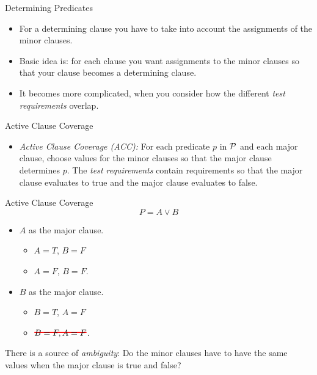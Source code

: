 \documentclass{beamer}
\newcommand{\predset}{{\cal P}}
\newcommand\hcancel[2][red]{\setbox0=\hbox{$#2$}%
\rlap{\raisebox{.45\ht0}{\textcolor{#1}{\rule{\wd0}{1pt}}}}#2}
\begin{document}
\begin{frame}{Determining Predicates}
    
  \begin{itemize}
  \item For a determining clause you have to take into account the
    assignments of the minor clauses.

  \item Basic idea is: for each clause you want assignments to the minor
clauses so that your clause becomes a determining clause.
\item It becomes more complicated, when you consider how the different
  {\it test requirements} overlap.
  \end{itemize} 
\end{frame}
\begin{frame}{Active Clause Coverage}
  \begin{itemize}
  \item {\em Active Clause Coverage (ACC):} For each predicate $p$ in
    $\predset$ and each major clause, choose values for the  minor
    clauses so that the major clause determines $p$. The {\it test
    requirements} contain  requirements so  that the major clause
    evaluates to true and the major clause evaluates to false.
  \end{itemize}

  
\end{frame}
\begin{frame}{Active Clause Coverage}
\[
 P = A \lor B 
\]
  \begin{itemize}
  \item $A$ as the major clause.
    \begin{itemize}
    \item $A=T$, $B=F$
    \item $A=F$, $B=F$.
    \end{itemize}
  \item $B$ as the major clause.
    \begin{itemize}
    \item $B=T$, $A=F$
    \item $\hcancel{B=F, A=F}$.
    \end{itemize}
  \end{itemize}
 There is a source of {\em ambiguity}: Do the minor clauses have to
 have the same values when the major clause is true and false?
\end{frame}
\end{document}
